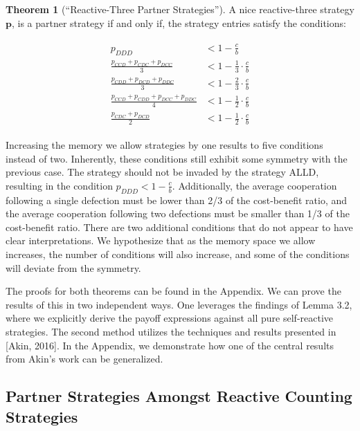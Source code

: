 \documentclass{article}
\theoremstyle{definition}
\newtheorem{theorem}{Theorem}[section]
\begin{document}
\begin{theorem}[``Reactive-Three Partner Strategies'']\label{theorem:reactive_three_partner_strategies}
  A nice reactive-three strategy $\mathbf{p}$, is a partner strategy if and only if,
  the strategy entries satisfy the conditions:
  
  \begin{align}\label{eq:three_bit_conditions}
    \begin{split}
    p_{DDD} & < 1\!-\! \frac{c}{b} \\
    \frac{p_{CCD} + p_{CDC} + p_{DCC}}{3} & < 1\!-\! \frac{1}{3} \cdot \frac{c}{b} \\
    \frac{p_{CDD} + p_{DCD} + p_{DDC}}{3} & < 1\!-\! \frac{2}{3} \cdot \frac{c}{b} \\
    \frac{p_{CCD} + p_{CDD} + p_{DCC} + p_{DDC}}{4}  & < 1\!-\! \frac{1}{2} \cdot \frac{c}{b}  \\
    \frac{p_{CDC} + p_{DCD}}{2} & < 1\!-\! \frac{1}{2} \cdot \frac{c}{b}
    \end{split}
  \end{align}
\end{theorem}

Increasing the memory we allow strategies by one results to five conditions instead
of two. Inherently, these conditions still exhibit some symmetry with the
previous case. The strategy should not be invaded by the strategy ALLD,
resulting in the condition $p_{DDD} < 1 - \frac{c}{b}$. Additionally, the
average cooperation following a single defection must be lower than 2/3 of the
cost-benefit ratio, and the average cooperation following two defections must be
smaller than 1/3 of the cost-benefit ratio. There are two additional conditions
that do not appear to have clear interpretations. We hypothesize that as the
memory space we allow increases, the number of conditions will also increase,
and some of the conditions will deviate from the symmetry.

The proofs for both theorems can be found in the Appendix. We can prove the
results of this in two independent ways. One leverages the findings of Lemma
3.2, where we explicitly derive the payoff expressions against all pure
self-reactive strategies. The second method utilizes the techniques and results
presented in [Akin, 2016]. In the Appendix, we demonstrate how one of the
central results from Akin's work can be generalized.


\subsection{Partner Strategies Amongst Reactive Counting Strategies}
\end{document}
